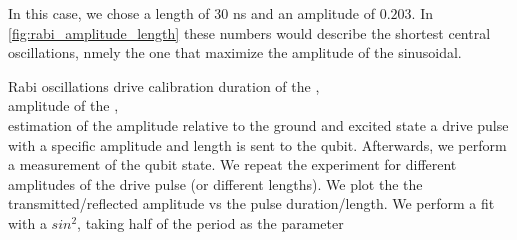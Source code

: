 In this case, we chose a length of $30$ ns and an amplitude of $0.203$.
In \cref{fig:rabi_amplitude_length} these numbers would describe the shortest central oscillations, nmely the one that maximize the amplitude of the sinusoidal.

\experimentrecap
{Rabi oscillations}
{drive calibration}
{duration of the \pipulse,\\amplitude of the \pipulse,\\estimation of the amplitude relative to the ground and excited state}
{a drive pulse with a specific amplitude and length is sent to the qubit. Afterwards, we perform a measurement of the qubit state. We repeat the experiment for different amplitudes of the drive pulse (or different lengths). We plot the the transmitted/reflected amplitude vs the pulse duration/length. We perform a fit with a $sin^2$, taking half of the period as the \pipulse parameter}


